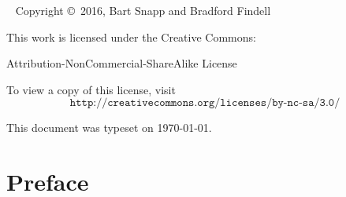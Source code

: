 

\newpage

\begin{fullwidth}
~\vfill
\thispagestyle{empty}
\setlength{\parindent}{0pt}
\setlength{\parskip}{\baselineskip}
Copyright \copyright~2016, Bart Snapp and Bradford Findell

\vspace{.5cm}

\noindent
This work is licensed under the Creative Commons:
\begin{center}
Attribution-NonCommercial-ShareAlike License 
\end{center}
To view a copy of this license, visit
\[
\texttt{http://creativecommons.org/licenses/by-nc-sa/3.0/}
\]


\vspace{.5cm}
\noindent This document was typeset on \today.
\end{fullwidth}


\chapter*{Preface}


